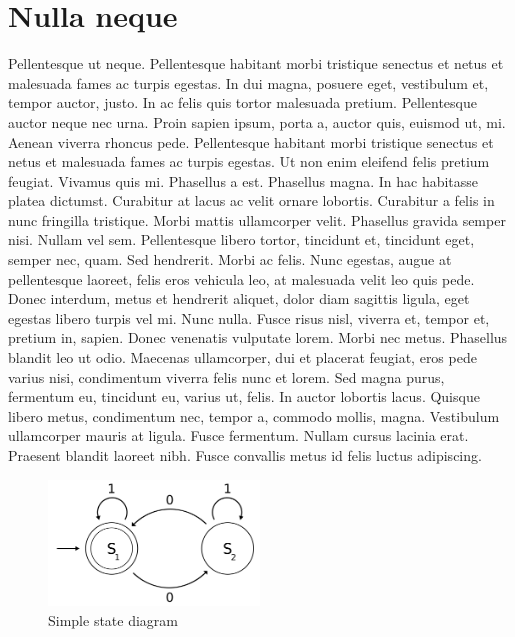 \section{Nulla neque}
 Pellentesque ut neque. Pellentesque habitant morbi tristique senectus et netus et malesuada fames ac turpis egestas. In dui magna, posuere eget, vestibulum et, tempor auctor, justo. In ac felis quis tortor malesuada pretium. Pellentesque auctor neque nec urna. Proin sapien ipsum, porta a, auctor quis, euismod ut, mi. Aenean viverra rhoncus pede. Pellentesque habitant morbi tristique senectus et netus et malesuada fames ac turpis egestas. Ut non enim eleifend felis pretium feugiat. Vivamus quis mi. Phasellus a est. Phasellus magna. In hac habitasse platea dictumst. Curabitur at lacus ac velit ornare lobortis. Curabitur a felis in nunc fringilla tristique. Morbi mattis ullamcorper velit. Phasellus gravida semper nisi. Nullam vel sem. Pellentesque libero tortor, tincidunt et, tincidunt eget, semper nec, quam. Sed hendrerit. Morbi ac felis. Nunc egestas, augue at pellentesque laoreet, felis eros vehicula leo, at malesuada velit leo quis pede. Donec interdum, metus et hendrerit aliquet, dolor diam sagittis ligula, eget egestas libero turpis vel mi. Nunc nulla. Fusce risus nisl, viverra et, tempor et, pretium in, sapien. Donec venenatis vulputate lorem. Morbi nec metus. Phasellus blandit leo ut odio. Maecenas ullamcorper, dui et placerat feugiat, eros pede varius nisi, condimentum viverra felis nunc et lorem. Sed magna purus, fermentum eu, tincidunt eu, varius ut, felis. In auctor lobortis lacus. Quisque libero metus, condimentum nec, tempor a, commodo mollis, magna. Vestibulum ullamcorper mauris at ligula. Fusce fermentum. Nullam cursus lacinia erat. Praesent blandit laoreet nibh. Fusce convallis metus id felis luctus adipiscing.
 
 \begin{figure}[t]
       \centering
       \includegraphics[width=0.5\textwidth]{Images/state-diagram}
       \caption{Simple state diagram}
       \label{fig:sdiag}
\end{figure}


